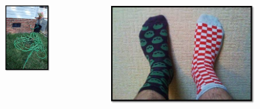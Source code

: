 \documentclass{beamer}
\begin{document}
\begin{frame}
\begin{columns}
\begin{column}{0.3\textwidth}
      \begin{figure}
        \centering
        \includegraphics[width=1.00\textwidth]{img/hose.png}
        \label{fig:hose}
      \end{figure}

    \end{column}
    \begin{column}{0.3\textwidth}

      \begin{figure}
        \centering
        \includegraphics[width=1.00\textwidth]{img/socks.jpg}
        \label{fig:socks}
      \end{figure}


\end{column}
\end{columns}
\end{frame}
\end{document}
